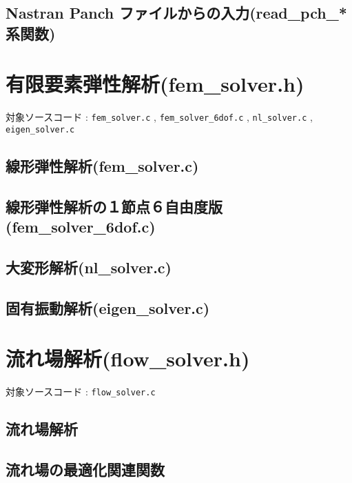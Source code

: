\documentclass[a4paper,10pt]{jarticle}
\begin{document}
\subsection{Nastran Panch ファイルからの入力(read\_pch\_* 系関数)}


\section{有限要素弾性解析(fem\_solver.h)}
対象ソースコード : \verb|fem_solver.c| , \verb|fem_solver_6dof.c| , \verb|nl_solver.c| , \verb|eigen_solver.c|

\subsection{線形弾性解析(fem\_solver.c)}

\subsection{線形弾性解析の１節点６自由度版(fem\_solver\_6dof.c)}

\subsection{大変形解析(nl\_solver.c)}

\subsection{固有振動解析(eigen\_solver.c)}


\section{流れ場解析(flow\_solver.h)}
対象ソースコード : \verb|flow_solver.c|

\subsection{流れ場解析}

\subsection{流れ場の最適化関連関数}

\end{document}
